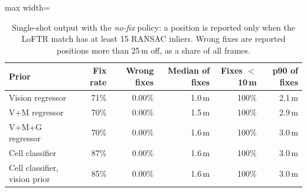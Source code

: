 \begin{table}[t]
\centering
\small
\caption{Single-shot output with the \emph{no-fix} policy: a position is reported only when the LoFTR match has at least 15 RANSAC inliers. Wrong fixes are reported positions more than 25\,m off, as a share of all frames.}
\label{tab:c2ffix}
\begin{adjustbox}{max width=\linewidth}
\begin{tabular}{lrrrrr}
\toprule
Prior & Fix rate & Wrong fixes & Median of fixes & Fixes $<$10\,m & p90 of fixes \\
\midrule
Vision regressor & 71\% & 0.00\% & 1.0\,m & 100\% & 2.1\,m \\
V+M regressor & 70\% & 0.00\% & 1.5\,m & 100\% & 2.9\,m \\
V+M+G regressor & 70\% & 0.00\% & 1.6\,m & 100\% & 3.0\,m \\
Cell classifier & 87\% & 0.00\% & 1.6\,m & 100\% & 3.0\,m \\
Cell classifier, vision prior & 85\% & 0.00\% & 1.6\,m & 100\% & 3.0\,m \\
\bottomrule
\end{tabular}
\end{adjustbox}
\end{table}

